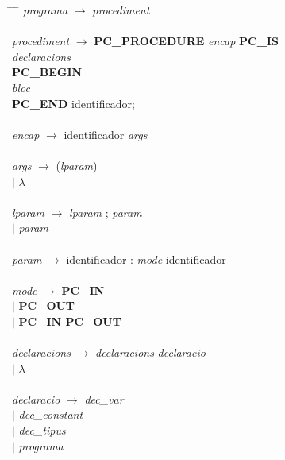 
    \begin{tabbing}
    \hspace*{2.0cm} \= \hspace*{0.5cm} \= \hspace*{0.8cm} \= \kill
        \textit{programa} \> $\rightarrow $ \> \textit{procediment} \\
        \\
        \textit{procediment} \> $ \rightarrow $ \> \textbf{PC\_PROCEDURE} \textit{encap} \textbf{PC\_IS} \\
        \> \> \> \textit{declaracions} \\
        \> \> \textbf{PC\_BEGIN} \\
        \> \> \> \textit{bloc} \\
        \> \> \textbf{PC\_END} identificador; \\
        \\
        \textit{encap} \> $ \rightarrow $ \> identificador \textit{args} \\
        \\
        \textit{args} \> $\rightarrow$ \> (\textit{lparam}) \\
        \> $ \mid $ \> $ \lambda $ \\
        \\
        \textit{lparam} \> $\rightarrow$ \> \textit{lparam} ; \textit{param} \\
        \> $\mid$ \> \textit{param} \\
        \\
        \textit{param} \> $\rightarrow$ \> identificador : \textit{mode} identificador \\
        \\
        \textit{mode} \> $\rightarrow$ \> \textbf{PC\_IN} \\
        \> $\mid$ \> \textbf{PC\_OUT} \\
        \> $\mid$ \> \textbf{PC\_IN PC\_OUT} \\
        \\
        \textit{declaracions} \> $\rightarrow$ \> \textit{declaracions} \textit{declaracio} \\
        \> $\mid$ \> $\lambda$ \\
        \\
        \textit{declaracio} \> $\rightarrow$ \> \textit{dec\_var} \\
        \> $\mid$ \> \textit{dec\_constant} \\
        \> $\mid$ \> \textit{dec\_tipus} \\
        \> $\mid$ \> \textit{programa} \\
        \\
        

\end{tabbing}
